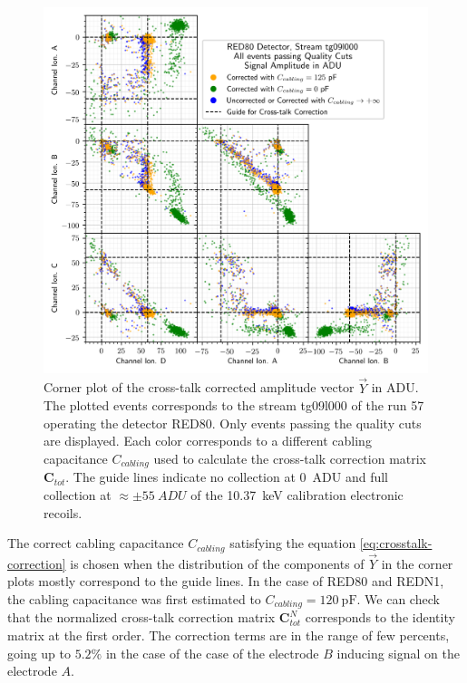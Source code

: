 \begin{figure}
\centering
\includegraphics[scale=1]{Figures/ElectrodesExperimental/red80_crosstalk_correction.png}
\caption{Corner plot of the cross-talk corrected amplitude vector $\vec{Y}$ in ADU. The plotted events corresponds to the stream tg09l000 of the run 57 operating the detector RED80. Only events passing the quality cuts are displayed. Each color corresponds to a different cabling capacitance $C_{cabling}$ used to calculate the cross-talk correction matrix $\bm{C}_{tot}$. The guide lines indicate no collection at \SI{0}{ADU} and full collection at $\approx \pm \SI{55}{ADU}$ of the \SI{10.37}{\kilo\eV} calibration electronic recoils.}
\label{fig:red80-crosstalk-correction}
\end{figure}

The correct cabling capacitance $C_{cabling}$ satisfying the equation \ref{eq:crosstalk-correction} is chosen when the distribution of the components of $\vec{Y}$ in the corner plots mostly correspond to the guide lines.
In the case of RED80 and REDN1, the cabling capacitance was first estimated to $C_{cabling} = \SI{120}{\pico\farad}$. 
We  can check that the normalized cross-talk correction matrix $\bm{C}_{tot}^N$ corresponds to the identity matrix at the first order. The correction terms are in the range of few percents, going up to $5.2\%$ in the case of the case of the electrode $B$ inducing signal on the electrode $A$.

